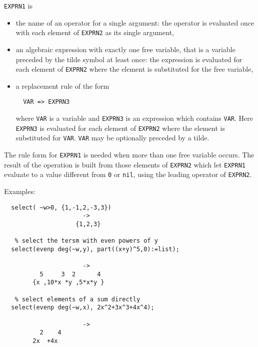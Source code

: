 {\tt EXPRN1} is
\begin{itemize}
\item the name of an operator for a single argument: the operator
 is evaluated once with each element of {\tt EXPRN2} as its single argument,
\item an algebraic expression with exactly one free variable, that is
a variable preceded by the tilde symbol at least once: the expression
 is evaluated for each element of {\tt EXPRN2} where the element is
 substituted for the free variable,
\item a replacement rule of the form
\begin{verbatim}
  VAR => EXPRN3
\end{verbatim} 
  where {\tt VAR} is a variable and {\tt EXPRN3} is an expression
  which contains {\tt VAR}.
  Here {\tt EXPRN3} is evaluated for each element of {\tt EXPRN2} where 
  the element is substituted for  {\tt VAR}. {\tt VAR} may be 
  optionally preceded by a tilde.
\end{itemize}
The rule form for {\tt EXPRN1} is needed when more than
one free variable occurs. The result of the operation is built
from those elements of {\tt EXPRN2} which let {\tt EXPRN1} evaluate
to a value different from {\tt 0} or {\tt nil}, using the
leading operator of  {\tt EXPRN2}.


Examples:

\begin{verbatim}
  select( ~w>0, {1,-1,2,-3,3})
                      ->
                    {1,2,3}

   % select the tersm with even powers of y 
  select(evenp deg(~w,y), part((x+y)^5,0):=list);

                      -> 
          5     3  2      4
        {x ,10*x *y ,5*x*y }

   % select elements of a sum directly
  select(evenp deg(~w,x), 2x^2+3x^3+4x^4);

                      ->
          2    4
        2x  +4x    
\end{verbatim}

